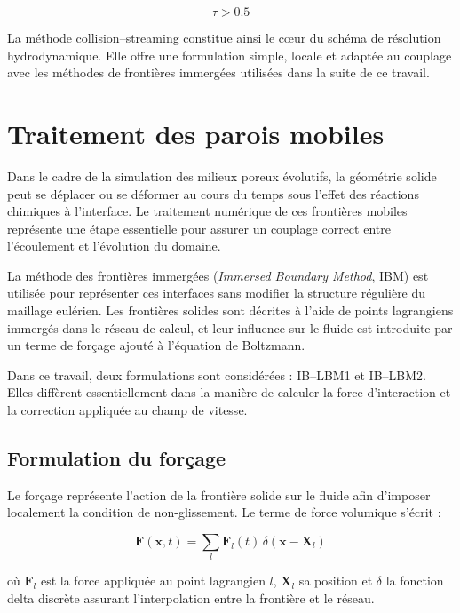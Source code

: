 \documentclass[12pt,a4paper]{report}
\begin{document}
\begin{equation}
\tau > 0.5
\end{equation}

La méthode collision--streaming constitue ainsi le cœur du schéma de résolution hydrodynamique. Elle offre une formulation simple, locale et adaptée au couplage avec les méthodes de frontières immergées utilisées dans la suite de ce travail.

\section{Traitement des parois mobiles}

Dans le cadre de la simulation des milieux poreux évolutifs, la géométrie solide peut se déplacer ou se déformer au cours du temps sous l’effet des réactions chimiques à l’interface. Le traitement numérique de ces frontières mobiles représente une étape essentielle pour assurer un couplage correct entre l’écoulement et l’évolution du domaine.  

La méthode des frontières immergées (\textit{Immersed Boundary Method}, IBM) est utilisée pour représenter ces interfaces sans modifier la structure régulière du maillage eulérien. Les frontières solides sont décrites à l’aide de points lagrangiens immergés dans le réseau de calcul, et leur influence sur le fluide est introduite par un terme de forçage ajouté à l’équation de Boltzmann.  

Dans ce travail, deux formulations sont considérées : IB--LBM1 et IB--LBM2. Elles diffèrent essentiellement dans la manière de calculer la force d’interaction et la correction appliquée au champ de vitesse.

\subsection{Formulation du forçage}

Le forçage représente l’action de la frontière solide sur le fluide afin d’imposer localement la condition de non-glissement. Le terme de force volumique s’écrit :

\begin{equation}
\mathbf{F}(\mathbf{x},t)
=
\sum_{l}
\mathbf{F}_{l}(t)\,
\delta(\mathbf{x}-\mathbf{X}_{l})
\end{equation}

où $\mathbf{F}_{l}$ est la force appliquée au point lagrangien $l$, $\mathbf{X}_{l}$ sa position et $\delta$ la fonction delta discrète assurant l’interpolation entre la frontière et le réseau.
\end{document}
